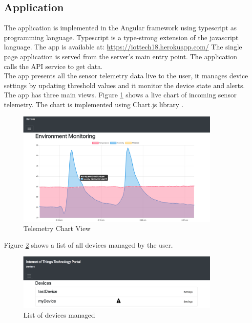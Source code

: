 \subsection{Application}
The application is implemented in the Angular framework using typescript as programming language. Typescript is a type-strong extension of the javascript language. The app is available at: \href{https://iottech18.herokuapp.com/}{https://iottech18.herokuapp.com/} The single page application is served from the server's main entry point. The application calls the API service to get data. \\

The app presents all the sensor telemetry data live to the user, it manages device settings by updating threshold values and it monitor the device state and alerts. The app has three main views.
Figure \ref{fig:chartview} shows a live chart of incoming sensor telemetry. The chart is implemented using Chart.js library \cite{chart}.

\begin{figure}[H]
    \centering
    \includegraphics[width=0.9\textwidth]{figures/App/app_dashboard}
    \caption{Telemetry Chart View}
    \label{fig:chartview}
\end{figure}

Figure \ref{fig:devicelist} shows a list of all devices managed by the user. 

\begin{figure}[H]
    \centering
    \includegraphics[width=0.9\textwidth]{figures/App/app_device_list}
    \caption{List of devices managed}
    \label{fig:devicelist}
\end{figure}

